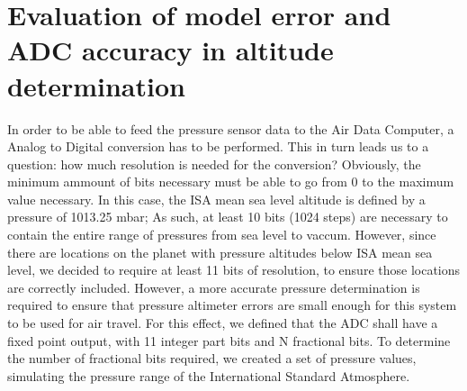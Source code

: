 \documentclass[english,palatino]{ist-report}
\begin{document}
\section{Evaluation of model error and ADC accuracy in altitude determination}
In order to be able to feed the pressure sensor data to the Air Data Computer, a Analog to Digital conversion has to be performed. This in turn leads us to a question: how much resolution is needed for the conversion? Obviously, the minimum ammount of bits necessary must be able to go from 0 to the maximum value necessary. In this case, the ISA mean sea level altitude is defined by a pressure of 1013.25 mbar; As such, at least 10 bits (1024 steps) are necessary to contain the entire range of pressures from sea level to vaccum. However, since there are locations on the planet with pressure altitudes below ISA mean sea level, we decided to require at least 11 bits of resolution, to ensure those locations are correctly included. However, a more accurate pressure determination is required to ensure that pressure altimeter errors are small enough for this system to be used for air travel. For this effect, we defined that the ADC shall have a fixed point output, with 11 integer part bits and N fractional bits. To determine the number of fractional bits required, we created a set of pressure values, simulating the pressure range of the International Standard Atmosphere. 
\end{document}
